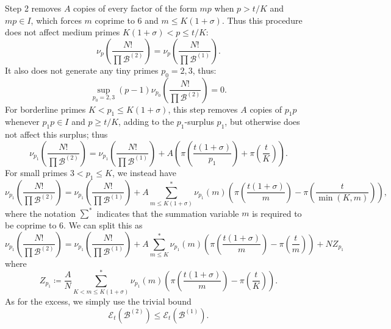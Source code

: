 \documentclass[12pt,a4paper,reqno]{amsart}
\numberwithin{equation}{section}
\theoremstyle{plain}
\theoremstyle{definition}
\newcommand\tuple{{\mathcal B}}
\newcommand\excess{{\mathcal{E}}}
\begin{document}
Step 2 removes $A$ copies of every factor of the form $mp$ when $p > t/K$ and $mp \in I$, which forces $m$ coprime to $6$ and $m \leq K(1+\sigma)$.  Thus this procedure does not affect medium primes $K(1+\sigma) < p \leq t/K$:
\begin{equation}\label{step2-unaffected}
  \nu_p\left(\frac{N!}{\prod \tuple^{(2)}}\right) = \nu_p\left(\frac{N!}{\prod \tuple^{(1)}}\right).
\end{equation}
It also does not generate any tiny primes $p_0=2,3$, thus:
\begin{equation}\label{step2-tiny}
\sup_{p_0=2,3} (p-1) \nu_{p_0}\left(\frac{N!}{\prod \tuple^{(2)}}\right)  = 0.
\end{equation}
For borderline primes $K < p_1 \leq K(1+\sigma)$, this step removes $A$ copies of $p_1 p$ whenever $p_1 p \in I$ and $p \geq t/K$, adding to the $p_1$-surplus $p_1$, but otherwise does not affect this surplus; thus
\begin{equation}\label{step2-borderline}
  \nu_{p_1}\left(\frac{N!}{\prod \tuple^{(2)}}\right) = \nu_{p_1}\left(\frac{N!}{\prod \tuple^{(1)}}\right) +
  A \left(\pi\left(\frac{t(1+\sigma)}{p_1}\right) + \pi\left(\frac{t}{K}\right)\right).
\end{equation}
For small primes $3 < p_1 \leq K$, we instead have
$$
  \nu_{p_1}\left(\frac{N!}{\prod \tuple^{(2)}}\right) = \nu_{p_1}\left(\frac{N!}{\prod \tuple^{(1)}}\right) +
  A \sum_{m \leq K(1+\sigma)}^* \nu_{p_1}(m) \left(\pi\left(\frac{t(1+\sigma)}{m}\right) - \pi\left(\frac{t}{\min(K,m)}\right)\right),
$$
where the notation $\sum^*$ indicates that the summation variable $m$ is required to be coprime to $6$.  We can split this as
\begin{equation}\label{step2-small}
  \nu_{p_1}\left(\frac{N!}{\prod \tuple^{(2)}}\right) = \nu_{p_1}\left(\frac{N!}{\prod \tuple^{(1)}}\right) +
  A \sum_{m \leq K}^* \nu_{p_1}(m) \left(\pi\left(\frac{t(1+\sigma)}{m}\right) - \pi\left(\frac{t}{m}\right)\right) + N Z_{p_1}
\end{equation}
where
\begin{equation}\label{zp-def}
   Z_{p_1} \coloneqq 
\frac{A}{N} \sum_{K < m \leq K(1+\sigma)}^* \nu_{p_1}(m) \left(\pi\left(\frac{t(1+\sigma)}{m}\right) - \pi\left(\frac{t}{K}\right)\right).
\end{equation}
As for the excess, we simply use the trivial bound
\begin{equation}\label{step2-excess}
\excess_t(\tuple^{(2)}) \leq \excess_t(\tuple^{(1)}).
\end{equation}
\end{document}
